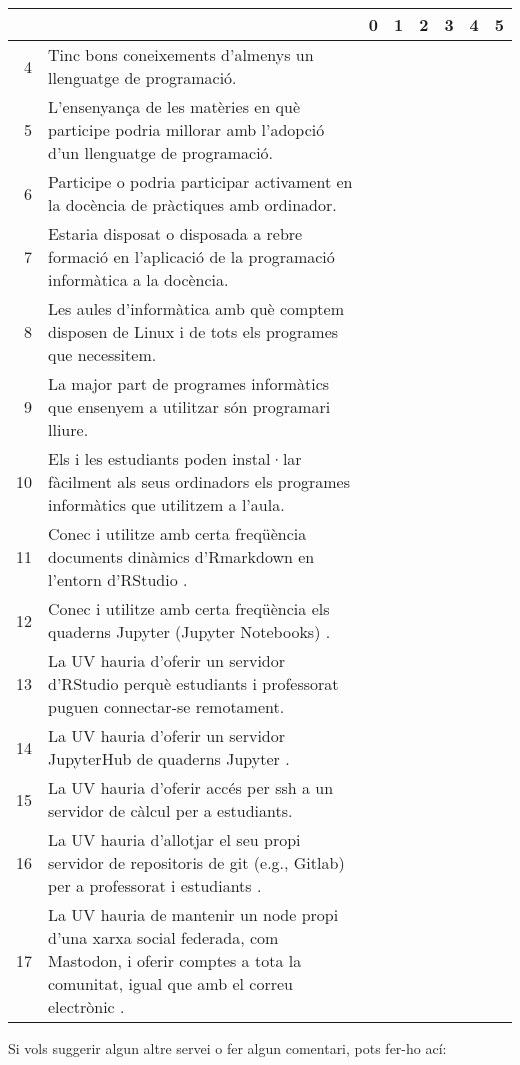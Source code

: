 \documentclass[a4paper,12pt]{article}
\begin{document}
{\small
\begin{tabular}{|r|p{9cm}|c|c|c|c|c|c|}
\toprule
&&0&1&2&3&4&5\\
\midrule
4&Tinc bons coneixements d'almenys un llenguatge de programació.&&&&&&\\
\midrule
5&L'ensenyança de les matèries en què participe podria millorar amb l'adopció d'un llenguatge de programació.&&&&&&\\
\midrule
6&Participe o podria participar activament en la docència de pràctiques amb ordinador.&&&&&&\\
\midrule
7&Estaria disposat o disposada a rebre formació en l'aplicació de la programació informàtica a la docència.&&&&&&\\
\midrule
8&Les aules d'informàtica amb què comptem disposen de Linux i de tots els programes que necessitem.&&&&&&\\
\midrule
9&La major part de programes informàtics que ensenyem a utilitzar són programari lliure.&&&&&&\\
\midrule
10&Els i les estudiants poden instal·lar fàcilment als seus ordinadors els programes informàtics que utilitzem a l'aula.&&&&&&\\
\midrule
11&Conec i utilitze amb certa freqüència documents dinàmics d'Rmarkdown en l'entorn d'RStudio \cite{RStudio}.&&&&&&\\
\midrule
12&Conec i utilitze amb certa freqüència els quaderns Jupyter (Jupyter Notebooks) \cite{Barba2019}.&&&&&&\\
\midrule
13&La UV hauria d'oferir un servidor d'RStudio perquè estudiants i professorat puguen connectar-se remotament.&&&&&&\\
\midrule
14&La UV hauria d'oferir un servidor JupyterHub de quaderns Jupyter \cite{JupyterHub}.&&&&&&\\
\midrule
15&La UV hauria d'oferir accés per \textsf{ssh} a un servidor de càlcul per a estudiants.&&&&&&\\
\midrule
16&La UV hauria d'allotjar el seu propi servidor de repositoris de \textsf{git} (e.g., Gitlab) per a professorat i estudiants \cite{Paderborn2023,PereiraBraga2023}.&&&&&&\\
\midrule
17&La UV hauria de mantenir un node propi d'una xarxa social federada, com Mastodon, i oferir comptes a tota la comunitat, igual que amb el correu electrònic \cite{Brembs2023,mastodon}.&&&&&&\\
\bottomrule
\end{tabular}
}

Si vols suggerir algun altre servei o fer algun comentari, pots fer-ho ací:
\vspace*{3cm}



\end{document}
